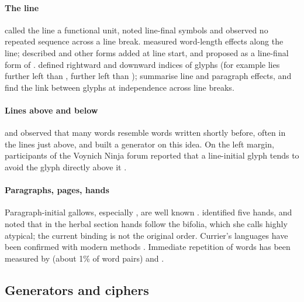 \paragraph{The line} \citet{currier1976} called the line a functional unit, noted line-final symbols and observed no
repeated sequence across a line break. \citet{vogt2012} measured word-length effects along the line;
\citet{smith2015linestart,smith2016linestart} described  and other forms added at line start, and
\citet{smith2016m} proposed  as a line-final form of . \citet{feaster2021,feaster2022} defined
rightward and downward indices of glyphs (for example  lies further left than ,  further left
than ); \citet{bowernlindemann2021} summarise line and paragraph effects, and \citet{rozanova2026} find the
link between glyphs at independence across line breaks.

\paragraph{Lines above and below} \citet{timm2014} and \citet{timmschinner2020} observed that many words resemble words
written shortly before, often in the lines just above, and built a generator on this idea. On the left margin,
participants of the Voynich Ninja forum reported that a line-initial glyph tends to avoid the glyph directly above it
\citep{tavie2024}.

\paragraph{Paragraphs, pages, hands} Paragraph-initial gallows, especially , are well known
\citep{currier1976,dimperio1978,stafford2022,feaster2022}. \citet{davis2020} identified five hands, and
\citet{davis2025} noted that in the herbal section hands follow the bifolia, which she calls highly atypical; the
current binding is not the original order. Currier's languages have been confirmed with modern methods
\citep{farrugia2022,parisel2026b}. Immediate repetition of words has been measured by \citet{boxer2022} (about 1\% of
word pairs) and \citet{bowernlindemann2021}.

\subsection{Generators and ciphers}

